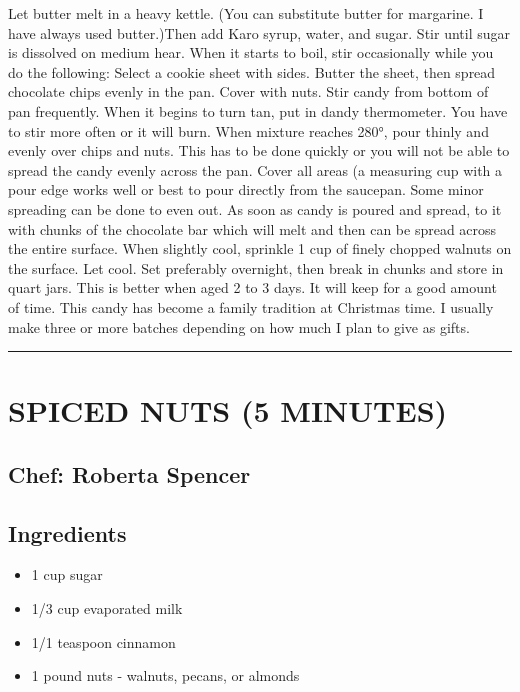 \documentclass[
]{book}
\providecommand{\tightlist}{%
  \setlength{\itemsep}{0pt}\setlength{\parskip}{0pt}}
\begin{document}
Let butter melt in a heavy kettle. (You can substitute butter for margarine. I have always used butter.)Then add Karo syrup, water, and sugar. Stir until sugar is dissolved on medium hear. When it starts to boil, stir occasionally while you do the following: Select a cookie sheet with sides. Butter the sheet, then spread chocolate chips evenly in the pan. Cover with nuts. Stir candy from bottom of pan frequently. When it begins to turn tan, put in dandy thermometer. You have to stir more often or it will burn. When mixture reaches 280°, pour thinly and evenly over chips and nuts. This has to be done quickly or you will not be able to spread the candy evenly across the pan. Cover all areas (a measuring cup with a pour edge works well or best to pour directly from the saucepan. Some minor spreading can be done to even out. As soon as candy is poured and spread, to it with chunks of the chocolate bar which will melt and then can be spread across the entire surface. When slightly cool, sprinkle 1 cup of finely chopped walnuts on the surface. Let cool. Set preferably overnight, then break in chunks and store in quart jars. This is better when aged 2 to 3 days. It will keep for a good amount of time. This candy has become a family tradition at Christmas time. I usually make three or more batches depending on how much I plan to give as gifts.

\begin{center}\rule{0.5\linewidth}{0.5pt}\end{center}

\hypertarget{spiced-nuts-5-minutes}{%
\section*{SPICED NUTS (5 MINUTES)}\label{spiced-nuts-5-minutes}}


\hypertarget{chef-roberta-spencer-38}{%
\subsection*{Chef: Roberta Spencer}\label{chef-roberta-spencer-38}}


\hypertarget{ingredients-105}{%
\subsection*{Ingredients}\label{ingredients-105}}


\begin{itemize}
\tightlist
\item
  1 cup sugar
\item
  1/3 cup evaporated milk
\item
  1/1 teaspoon cinnamon
\item
  1 pound nuts - walnuts, pecans, or almonds
\end{itemize}
\end{document}
